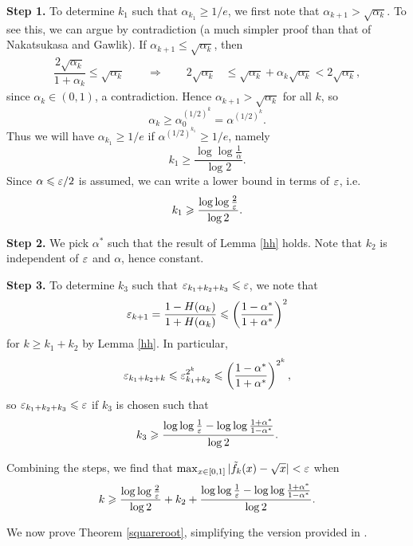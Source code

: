 \begin{appendices}
\bigskip{}

\textbf{Step 1.} To determine $k_1$ such that $\alpha_{k_1}\geq 1/e$, we first note that $\alpha_{k+1}> \sqrt{\alpha_k}$. To see this, we can argue by contradiction (a much simpler proof than that of Nakatsukasa and Gawlik). If $\alpha_{k+1} \leq \sqrt{\alpha_k}$, then
\begin{align*}
    \dfrac{2\sqrt{\alpha_k}}{1+\alpha_k}\leq \sqrt{\alpha_k} \qquad \Longrightarrow\qquad 2\sqrt{\alpha_k} &\leq \sqrt{\alpha_k} + \alpha_k\sqrt{\alpha_k} < 2\sqrt{\alpha_k},
\end{align*}
since $\alpha_k \in(0,1)$, a contradiction. Hence $\alpha_{k+1}>\sqrt{\alpha_k}$ for all $k$, so
\[\alpha_k \geq \alpha_0^{(1/2)^k}=\alpha^{(1/2)^k}.\]
Thus we will have $\alpha_{k_1}\geq 1/e$ if $\alpha^{(1/2)^{k_1}}\geq 1/e$, namely
\[k_1\geq \dfrac{\log\log \frac{1}{\alpha}}{\log 2}.\]
Since $\alpha\leqslant \varepsilon/2$ is assumed, we can write a lower bound in terms of $\varepsilon$, i.e.
\[k_1 \geqslant \dfrac{\log\log \frac{2}{\varepsilon}}{\log 2}.\]

\textbf{Step 2.} We pick $\alpha^*$ such that the result of Lemma \ref{hh} holds. Note that $k_2$ is independent of $\varepsilon$ and $\alpha$, hence constant.

\bigskip{}

\textbf{Step 3.} To determine $k_3$ such that $\varepsilon_{k_1+k_2+k_3} \leqslant \varepsilon$, we note that
\[\varepsilon_{k+1}=\dfrac{1-H(\alpha_k)}{1+H(\alpha_k)}\leqslant \left(\dfrac{1-\alpha^*}{1+\alpha^*}\right)^2\]
for $k\geq k_1+k_2$ by Lemma \ref{hh}. In particular,
\[\varepsilon_{k_1+k_2+k}\leqslant \varepsilon_{k_1+k_2}^{2^k}\leqslant \left(\dfrac{1-\alpha^*}{1+\alpha^*}\right)^{2^k},\]
so $\varepsilon_{k_1+k_2+k_3}\leqslant \varepsilon$ if $k_3$ is chosen such that
\[k_3 \geqslant \dfrac{\log\log\frac{1}{\varepsilon}-\log\log\frac{1+\alpha^*}{1-\alpha^*}}{\log 2}.\]

Combining the steps, we find that $\max_{x\in[0,1]}|\tilde{f}_k(x)-\sqrt{x}|< \varepsilon$ when
\[k \geqslant \dfrac{\log\log\frac{2}{\varepsilon}}{\log 2} + k_2 + \dfrac{\log\log\frac{1}{\varepsilon}-\log\log\frac{1+\alpha^*}{1-\alpha^*}}{\log 2}.\]

We now prove Theorem \ref{squareroot}, simplifying the version provided in \cite{Yuji}.


\end{appendices}

